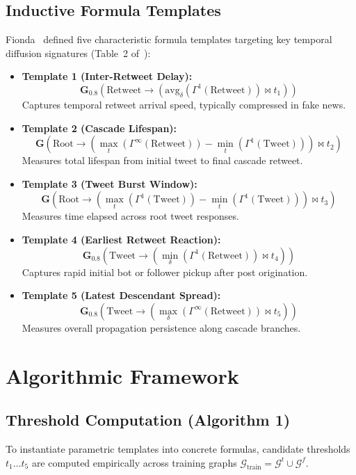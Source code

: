 \documentclass[10pt,twocolumn]{article}
\begin{document}
\subsection{Inductive Formula Templates}
Fionda~\cite{fionda2025logic} defined five characteristic formula templates targeting key temporal diffusion signatures (Table~2 of~\cite{fionda2025logic}):
\begin{itemize}
    \item \textbf{Template 1 (Inter-Retweet Delay):} 
    $$\mathbf{G}_{0.8}(\text{Retweet} \to (\text{avg}_\delta(\Gamma^1(\text{Retweet})) \bowtie t_1))$$
    Captures temporal retweet arrival speed, typically compressed in fake news.
    \item \textbf{Template 2 (Cascade Lifespan):} 
    $$\mathbf{G}(\text{Root} \to (\max_t(\Gamma^\infty(\text{Retweet})) - \min_t(\Gamma^1(\text{Tweet}))) \bowtie t_2)$$
    Measures total lifespan from initial tweet to final cascade retweet.
    \item \textbf{Template 3 (Tweet Burst Window):} 
    $$\mathbf{G}(\text{Root} \to (\max_t(\Gamma^1(\text{Tweet})) - \min_t(\Gamma^1(\text{Tweet}))) \bowtie t_3)$$
    Measures time elapsed across root tweet responses.
    \item \textbf{Template 4 (Earliest Retweet Reaction):} 
    $$\mathbf{G}_{0.8}(\text{Tweet} \to (\min_\delta(\Gamma^1(\text{Retweet})) \bowtie t_4))$$
    Captures rapid initial bot or follower pickup after post origination.
    \item \textbf{Template 5 (Latest Descendant Spread):} 
    $$\mathbf{G}_{0.8}(\text{Tweet} \to (\max_\delta(\Gamma^\infty(\text{Retweet})) \bowtie t_5))$$
    Measures overall propagation persistence along cascade branches.
\end{itemize}

\section{Algorithmic Framework}

\subsection{Threshold Computation (Algorithm 1)}
To instantiate parametric templates into concrete formulas, candidate thresholds $t_1 \dots t_5$ are computed empirically across training graphs $\mathcal{G}_{\text{train}} = \mathcal{G}^t \cup \mathcal{G}^f$.
\end{document}
